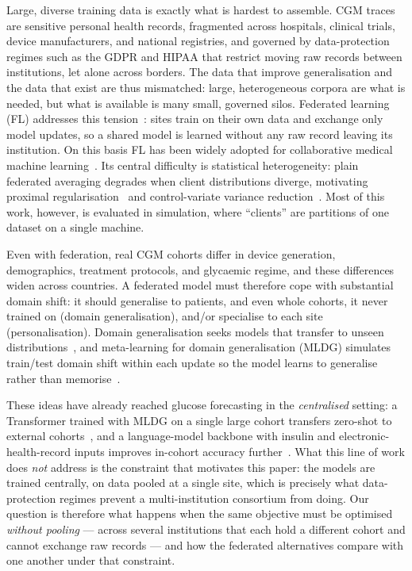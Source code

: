 \documentclass[10pt,letterpaper]{article}
\begin{document}
Large, diverse training data is exactly what is hardest to assemble. CGM traces
are sensitive personal health records, fragmented across hospitals, clinical
trials, device manufacturers, and national registries, and governed by
data-protection regimes such as the GDPR and HIPAA that restrict moving raw
records between institutions, let alone across borders. The data that improve
generalisation and the data that exist are thus mismatched: large, heterogeneous
corpora are what is needed, but what is available is many small, governed silos.
Federated learning (FL) addresses this tension~\cite{mcmahan2017fedavg}: sites
train on their own data and exchange only model updates, so a shared model is
learned without any raw record leaving its institution. On this basis FL has been
widely adopted for collaborative medical machine
learning~\cite{rieke2020future,sheller2020federated,kaissis2020secure}. Its
central difficulty is statistical heterogeneity: plain federated averaging
degrades when client distributions diverge, motivating proximal
regularisation~\cite{li2020fedprox} and control-variate variance
reduction~\cite{karimireddy2020scaffold}. Most of this work, however, is evaluated
in simulation, where ``clients'' are partitions of one dataset on a single
machine.

Even with federation, real CGM cohorts differ in device generation, demographics,
treatment protocols, and glycaemic regime, and these differences widen across
countries. A federated model must therefore cope with substantial domain shift: it
should generalise to patients, and even whole cohorts, it never trained on (domain
generalisation), and/or specialise to each site (personalisation). Domain
generalisation seeks models that transfer to unseen
distributions~\cite{zhou2022dgsurvey}, and meta-learning for domain generalisation
(MLDG) simulates train/test domain shift within each update so the model learns to
generalise rather than memorise~\cite{li2018mldg}.

These ideas have already reached glucose forecasting in the \emph{centralised}
setting: a Transformer trained with MLDG on a single large cohort transfers
zero-shot to external cohorts~\cite{zhu2024gpformer}, and a language-model
backbone with insulin and electronic-health-record inputs improves in-cohort
accuracy further~\cite{zhu2026glullm}. What this line of work does \emph{not}
address is the constraint that motivates this paper: the models are trained
centrally, on data pooled at a single site, which is precisely what
data-protection regimes prevent a multi-institution consortium from doing. Our
question is therefore what happens when the same objective must be
optimised \emph{without pooling} --- across several institutions that each hold a
different cohort and cannot exchange raw records --- and how the federated
alternatives compare with one another under that constraint.
\end{document}
